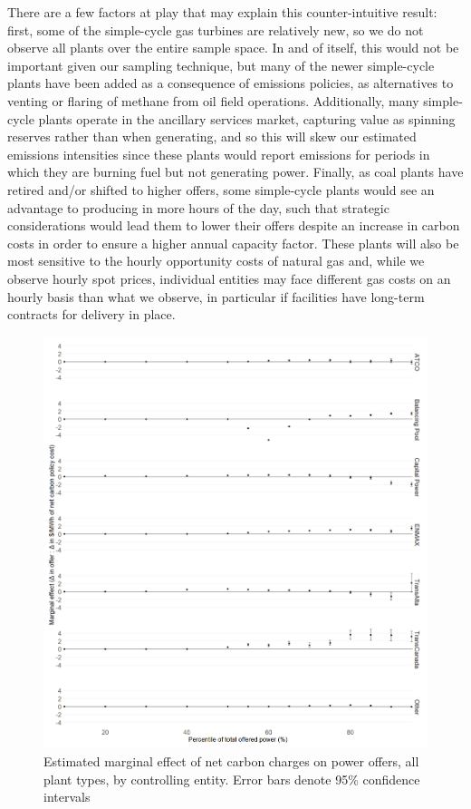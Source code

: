 \documentclass[12pt]{article}
\begin{document}
There are a few factors at play that may explain this counter-intuitive result: first, some of the simple-cycle gas turbines are relatively new, so we do not observe all plants over the entire sample space. In and of itself, this would not be important given our sampling technique, but many of the newer simple-cycle plants have been added as a consequence of emissions policies, as alternatives to venting or flaring of methane from oil field operations. Additionally, many simple-cycle plants operate in the ancillary services market, capturing value as spinning reserves rather than when generating, and so this will skew our estimated emissions intensities since these plants would report emissions for periods in which they are burning fuel but not generating power. Finally, as coal plants have retired and/or shifted to higher offers, some simple-cycle plants would see an advantage to producing in more hours of the day, such that strategic considerations would lead them to lower their offers despite an increase in carbon costs in order to ensure a higher annual capacity factor. These plants will also be most sensitive to the hourly opportunity costs of natural gas and, while we observe hourly spot prices, individual entities may face different gas costs on an hourly basis than what we observe, in particular if facilities have long-term contracts for delivery in place.

\begin{figure}[ht!]
    \centering
     \includegraphics[width=.9\textwidth]{../images/offer.png}
    \caption{Estimated marginal effect of net carbon charges on power offers, all plant types, by controlling entity. Error bars denote 95\% confidence intervals}
    \label{fig:offer}
\end{figure}
\end{document}
